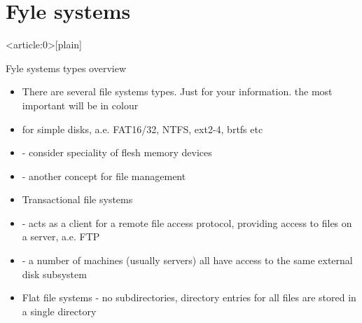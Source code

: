 \documentclass[usenames,dvipsnames,10pt,aspectratio=169]{beamer}
\begin{document}
\section{Fyle systems}
{ %
    \begin{frame}<article:0>[plain]
     \end{frame}
}

\begin{frame}{Fyle systems types overview}
    \begin{itemize}
        \item There are several file systems types. Just for your information. the most important will be in  colour
        \item{} for simple disks, a.e. FAT16/32, NTFS, ext2-4, brtfs etc
        \item{} - consider speciality of flesh memory devices
        \item{} - another concept for file management
        \item Transactional file systems
        \item{} - acts as a client for a remote file access protocol, providing access to files on a server, a.e. FTP
        \item{} - a number of machines (usually servers) all have access to the same external disk subsystem
        \item Flat file systems - no subdirectories, directory entries for all files are stored in a single directory
    \end{itemize}
\end{frame}
\end{document}
